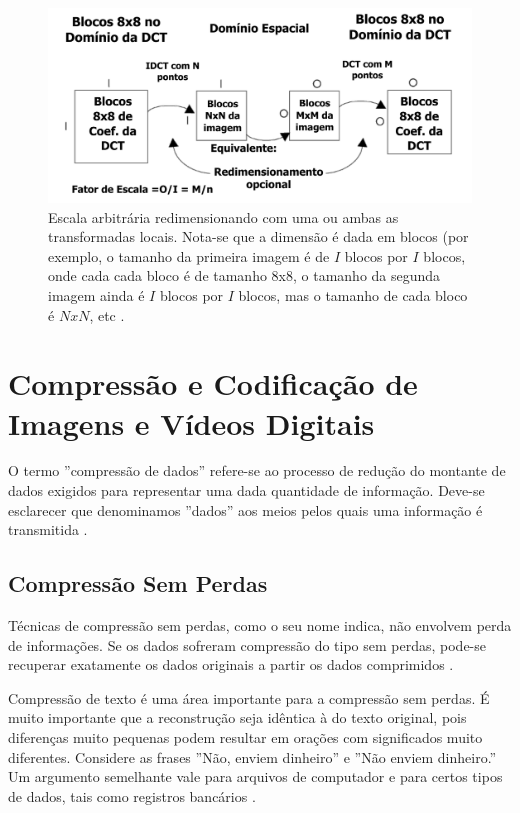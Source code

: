 \begin{figure}[h]
	\centering
	\includegraphics[scale=0.6]
{figuras/DCT_RES.pdf}
	\caption{Escala arbitrária redimensionando com uma ou ambas as transformadas locais. Nota-se que a dimensão é dada em blocos (por exemplo, o tamanho da primeira imagem é de $I$ blocos por $I$ blocos, onde cada cada bloco é de tamanho 8x8, o tamanho da segunda imagem ainda é $I$ blocos por $I$ blocos, mas o tamanho de cada bloco é $NxN$, etc \cite{salazar2007complexity}.}
	\label{DCT_RES}
\end{figure}

\section{Compressão e Codificação de Imagens e Vídeos Digitais}

O termo ''compressão de dados'' refere-se ao processo de redução do montante de dados exigidos para representar uma dada quantidade de informação. Deve-se esclarecer que denominamos ''dados'' aos meios pelos quais uma informação é transmitida \cite{richardson2011h}.

\subsection{Compressão Sem Perdas}
Técnicas de compressão sem perdas, como o seu nome indica, não envolvem perda de informações. Se os dados sofreram compressão do tipo sem perdas, pode-se recuperar exatamente os dados originais a partir  os dados comprimidos \cite{ukrit2011survey}.

Compressão de texto é uma área importante para a compressão sem perdas. É muito importante que a reconstrução seja idêntica à do texto original, pois diferenças muito pequenas podem resultar em orações com significados muito diferentes. Considere as frases ''Não, enviem dinheiro'' e ''Não enviem dinheiro.'' Um argumento semelhante vale para arquivos de computador e para certos tipos de dados, tais como registros bancários \cite{sayood2012introduction}.

